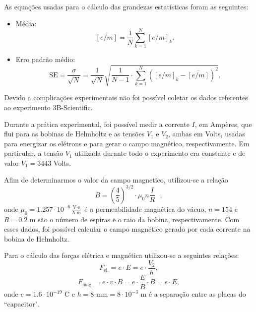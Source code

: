 \documentclass[12pt,a4paper]{article}
\begin{document}
\begin{enumerate}
    As equações usadas para o cálculo das grandezas estatísticas foram as seguintes:
    \begin{itemize}
        \item Média:
        \begin{equation} \label{eq:Media}
            \overline{[e/m]}=\frac{1}{N}\sum_{k=1}^{N}[e/m]_{k}.
        \end{equation}

        \item Erro padrão médio:
        \begin{equation} \label{eq:SE}
            \text{SE}=\frac{\sigma}{\sqrt{N}}=\frac{1}{\sqrt{N}}\sqrt{\frac{1}{N-1}\cdot\sum_{k=1}^{N}\left(\left[e/m\right]_{k}-\overline{\left[e/m\right]}\right)^{2}}.
        \end{equation}
    \end{itemize}

    Devido a complicações experimentais não foi possível coletar os dados referentes ao experimento 3B-Scientific.

    Durante a prática experimental, foi possível medir a corrente $I$, em Ampères, que flui para as bobinas de Helmholtz e as tensões $V_1$ e $V_2$, ambas em Volts, usadas para energizar os elétrons e para gerar o campo magnético, respectivamente. Em particular, a tensão $V_1$ utilizada durante todo o experimento era constante e de valor $V_1=3443$ Volts.

    Afim de determinarmos o valor da campo magnetico, utilizou-se a relação
    \begin{equation} \label{eq:Relação B-I}
        B=\left(\frac{4}{5}\right)^{3/2}\cdot\mu_0 n\frac{I}{R}\text{ },
    \end{equation}
    onde $\mu_0=1.257\cdot10^{-6}\frac{\text{V}\cdot\text{s}}{\text{A}\cdot\text{m}}$ é a permeabilidade magnética do vácuo, $n=154$ e $R=0.2\text{ m}$ são o número de espiras e o raio da bobina, respectivamente. Com esses dados, foi possível calcular o campo magnético gerado por cada corrente na bobina de Helmholtz.

    Para o cálculo das forças elétrica e magnética utilizou-se a seguintes relações:
    \begin{equation} \label{eq:Fel}
        F_{\text{el.}}=e\cdot E=e\cdot\frac{V_2}{h},
    \end{equation}
    \begin{equation} \label{eq:Fmag}
        F_{\text{mag.}}=e\cdot v\cdot B=e\cdot\frac{E}{B}\cdot B=e\cdot E, 
    \end{equation}
    onde $e=1.6\cdot10^{-19}\text{ C}$ e $h=8\text{ mm}=8\cdot10^{-3}\text{ m}$ é a separação entre as placas do ``capacitor".


\end{enumerate}
\end{document}
